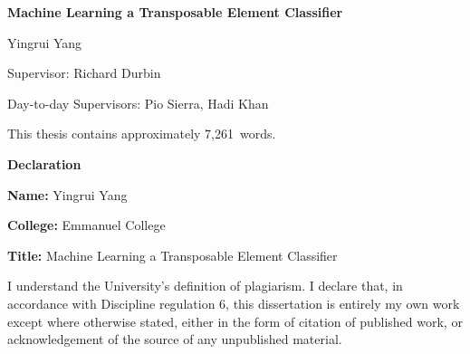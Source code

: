 \documentclass[12pt]{article}
\newcommand\wordcount{7,261}
\begin{document}
\begin{titlepage}
    \centering
    \vspace*{2cm}
    
    {\LARGE\bfseries Machine Learning a Transposable Element Classifier\par}
    
    \vspace{3cm}
    
    {\Large Yingrui Yang\par}
    
    \vspace{3cm}
    
    {\large 
    Supervisor: Richard Durbin\par
    \vspace{0.5cm}
    Day-to-day Supervisors: Pio Sierra, Hadi Khan\par
    }
    
    \vfill
    
    {\normalsize This thesis contains approximately \wordcount\ words.\par}
    
    \vspace{1cm}
    
\end{titlepage}

\newpage
\thispagestyle{empty}

\vspace*{1cm}

\begin{center}
    {\Large\bfseries Declaration\par}
\end{center}

\vspace{1cm}

\noindent\textbf{Name:} Yingrui Yang

\vspace{0.5cm}

\noindent\textbf{College:} Emmanuel College

\vspace{0.5cm}

\noindent\textbf{Title:} Machine Learning a Transposable Element Classifier

\vspace{1.5cm}

\noindent I understand the University's definition of plagiarism. I declare that, in accordance with Discipline regulation 6, this dissertation is entirely my own work except where otherwise stated, either in the form of citation of published work, or acknowledgement of the source of any unpublished material.
\end{document}
